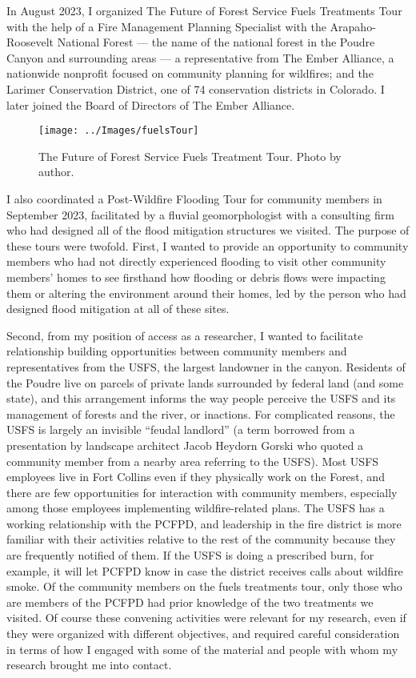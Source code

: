 \documentclass[
]{article}
\begin{document}
In August 2023, I organized The Future of Forest Service Fuels Treatments Tour with the help of a Fire Management Planning Specialist with the Arapaho-Roosevelt National Forest --- the name of the national forest in the Poudre Canyon and surrounding areas --- a representative from The Ember Alliance, a nationwide nonprofit focused on community planning for wildfires; and the Larimer Conservation District, one of 74 conservation districts in Colorado. I later joined the Board of Directors of The Ember Alliance.

\begin{figure}
\texttt{[image: ../Images/fuelsTour]} \caption[Fuels treatments tour]{The Future of Forest Service Fuels Treatment Tour. Photo by author.}\label{fig:figureTitle11}
\end{figure}

I also coordinated a Post-Wildfire Flooding Tour for community members in September 2023, facilitated by a fluvial geomorphologist with a consulting firm who had designed all of the flood mitigation structures we visited. The purpose of these tours were twofold. First, I wanted to provide an opportunity to community members who had not directly experienced flooding to visit other community members' homes to see firsthand how flooding or debris flows were impacting them or altering the environment around their homes, led by the person who had designed flood mitigation at all of these sites.

Second, from my position of access as a researcher, I wanted to facilitate relationship building opportunities between community members and representatives from the USFS, the largest landowner in the canyon. Residents of the Poudre live on parcels of private lands surrounded by federal land (and some state), and this arrangement informs the way people perceive the USFS and its management of forests and the river, or inactions. For complicated reasons, the USFS is largely an invisible ``feudal landlord'' (a term borrowed from a presentation by landscape architect Jacob Heydorn Gorski who quoted a community member from a nearby area referring to the USFS). Most USFS employees live in Fort Collins even if they physically work on the Forest, and there are few opportunities for interaction with community members, especially among those employees implementing wildfire-related plans. The USFS has a working relationship with the PCFPD, and leadership in the fire district is more familiar with their activities relative to the rest of the community because they are frequently notified of them. If the USFS is doing a prescribed burn, for example, it will let PCFPD know in case the district receives calls about wildfire smoke. Of the community members on the fuels treatments tour, only those who are members of the PCFPD had prior knowledge of the two treatments we visited. Of course these convening activities were relevant for my research, even if they were organized with different objectives, and required careful consideration in terms of how I engaged with some of the material and people with whom my research brought me into contact.
\end{document}

